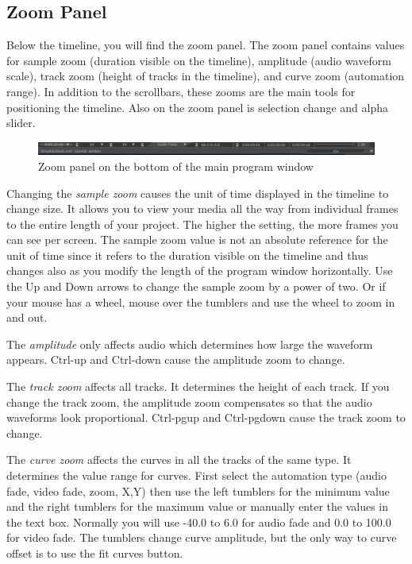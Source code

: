 \subsection{Zoom Panel}%
\label{sub:zoom_panel}

Below the timeline, you will find the zoom panel. 
The zoom panel contains values for sample zoom (duration visible on the timeline), amplitude (audio waveform scale), track zoom (height of tracks in the timeline), and curve zoom (automation range). 
In addition to the scrollbars, these zooms are the main tools for positioning the timeline.  
Also on the zoom panel is selection change and alpha slider.

\begin{figure}[htpb]
    \centering
    \includegraphics[width=0.99\linewidth]{images/zoompanel.png}
    \caption{Zoom panel on the bottom of the main program window}
    \label{fig:zoompanel}
\end{figure}

Changing the \emph{sample zoom} causes the unit of time displayed in the timeline to change size. 
It allows you to view your media all the way from individual frames to the entire length of your project. 
The higher the setting, the more frames you can see per screen. 
The sample zoom value is not an absolute reference for the unit of time since it refers to the duration visible on the timeline and thus changes also as you modify the length of the program window horizontally.
Use the Up and Down arrows to change the sample zoom by a power of two. 
Or if your mouse has a wheel, mouse over the tumblers and use the wheel to zoom in and out.


The \emph{amplitude} only affects audio which determines how large the waveform appears. Ctrl-up and Ctrl-down cause the amplitude zoom to change.

The \emph{track zoom} affects all tracks. 
It determines the height of each track. 
If you change the track zoom, the amplitude zoom compensates so that the audio waveforms look proportional. 
Ctrl-pgup and Ctrl-pgdown cause the track zoom to change.

The \emph{curve zoom} affects the curves in all the tracks of the same type. 
It determines the value range for curves. 
First select the automation type (audio fade, video fade, zoom, X,Y) then use the left tumblers for the minimum value and the right tumblers for the maximum value or manually enter the values in the text box. 
Normally you will use -40.0 to 6.0 for audio fade and 0.0 to 100.0 for video fade. 
The tumblers change curve amplitude, but the only way to curve offset is to use the fit curves button.

